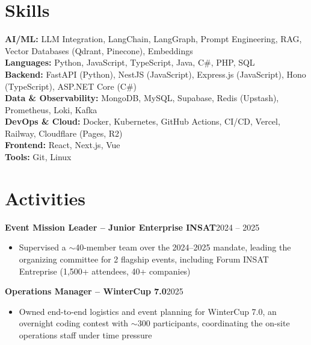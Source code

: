 \documentclass[10pt,a4paper]{article}
\newcommand{\entry}[2]{\vspace{1pt}\noindent\textbf{#1}\hfill{\color{muted}#2}\par}
\begin{document}
\section{Skills}
\textbf{AI/ML:} LLM Integration, LangChain, LangGraph, Prompt Engineering, RAG, Vector Databases (Qdrant, Pinecone), Embeddings\\
\textbf{Languages:} Python, JavaScript, TypeScript, Java, C\#, PHP, SQL\\
\textbf{Backend:} FastAPI (Python), NestJS (JavaScript), Express.js (JavaScript), Hono (TypeScript), ASP.NET Core (C\#)\\
\textbf{Data \& Observability:} MongoDB, MySQL, Supabase, Redis (Upstash), Prometheus, Loki, Kafka\\
\textbf{DevOps \& Cloud:} Docker, Kubernetes, GitHub Actions, CI/CD, Vercel, Railway, Cloudflare (Pages, R2)\\
\textbf{Frontend:} React, Next.js, Vue\\
\textbf{Tools:} Git, Linux

\section{Activities}
\entry{Event Mission Leader -- Junior Enterprise INSAT}{2024 -- 2025}
\begin{itemize}
  \item Supervised a $\sim$40-member team over the 2024--2025 mandate, leading the organizing committee for 2 flagship events, including Forum INSAT Entreprise (1,500+ attendees, 40+ companies)
\end{itemize}
\entry{Operations Manager -- WinterCup 7.0}{2025}
\begin{itemize}
  \item Owned end-to-end logistics and event planning for WinterCup 7.0, an overnight coding contest with $\sim$300 participants, coordinating the on-site operations staff under time pressure
\end{itemize}
\end{document}
